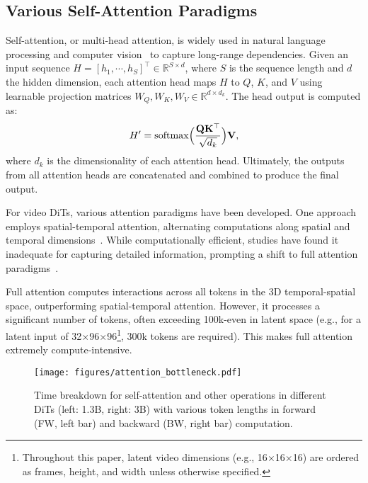 \subsection{Various Self-Attention Paradigms} 
\label{sec:self_attention}

Self-attention, or multi-head attention, is widely used in natural language processing and computer vision~\cite{waswani2017attention,dosovitskiy2020imagevit} to capture long-range dependencies. Given an input sequence $H = [h_1, \cdots, h_S]^\top \in \mathbb{R}^{S \times d}$, where $S$ is the sequence length and $d$ the hidden dimension, each attention head maps $H$ to ${Q}$, ${K}$, and ${V}$ using learnable projection matrices $W_Q, W_K, W_V \in \mathbb{R}^{d \times d_k}$. The head output is computed as:
\[
H' = \mathrm{softmax}\Bigl(\frac{\mathbf{Q}\mathbf{K}^\top}{\sqrt{d_k}}\Bigr)\mathbf{V},
\]
where $d_k$ is the dimensionality of each attention head. Ultimately, the outputs from all attention heads are concatenated and combined to produce the final output.

For video DiTs, various attention paradigms have been developed. One approach employs spatial-temporal attention, alternating computations along spatial and temporal dimensions~\cite{ma2024latte}. While computationally efficient, studies have found it inadequate for capturing detailed information, prompting a shift to full attention paradigms~\cite{HunyuanVideo,polyak2024movie,yang2024cogvideox}.

Full attention computes interactions across all tokens in the 3D temporal-spatial space, outperforming spatial-temporal attention. However, it processes a significant number of tokens, often exceeding 100k-even in latent space (e.g., for a latent input of 32$\times$96$\times$96\footnote{Throughout this paper, latent video dimensions (e.g., 16$\times$16$\times$16) are ordered as frames, height, and width unless otherwise specified.}, 300k tokens are required). This makes full attention extremely compute-intensive.




\begin{figure}[t]
  \centering
  \texttt{[image: figures/attention\_bottleneck.pdf]} 

  \caption{Time breakdown for self-attention and other operations in different DiTs (left: 1.3B, right: 3B) with various token lengths in forward (FW, left bar) and backward (BW, right bar) computation.} 
  \label{fig:attention_bottleneck} 
\end{figure}



